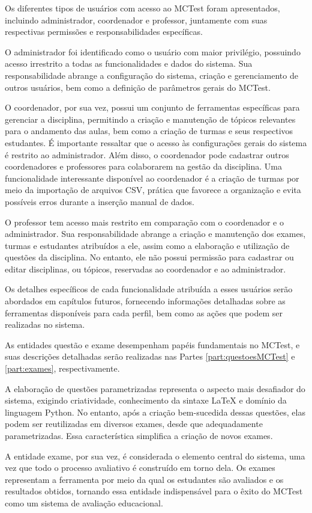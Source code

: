 Os diferentes tipos de usuários com acesso ao MCTest foram apresentados, incluindo administrador, coordenador e professor, juntamente com suas respectivas permissões e responsabilidades específicas.

O administrador foi identificado como o usuário com maior privilégio, possuindo acesso irrestrito a todas as funcionalidades e dados do sistema. Sua responsabilidade abrange a configuração do sistema, criação e gerenciamento de outros usuários, bem como a definição de parâmetros gerais do MCTest.

O coordenador, por sua vez, possui um conjunto de ferramentas específicas para gerenciar a disciplina, permitindo a criação e manutenção de tópicos relevantes para o andamento das aulas, bem como a criação de turmas e seus respectivos estudantes. É importante ressaltar que o acesso às configurações gerais do sistema é restrito ao administrador. Além disso, o coordenador pode cadastrar outros coordenadores e professores para colaborarem na gestão da disciplina. Uma funcionalidade interessante disponível ao coordenador é a criação de turmas por meio da importação de arquivos CSV, prática que favorece a organização e evita possíveis erros durante a inserção manual de dados.

O professor tem acesso mais restrito em comparação com o coordenador e o administrador. Sua responsabilidade abrange a criação e manutenção dos exames, turmas e estudantes atribuídos a ele, assim como a elaboração e utilização de questões da disciplina. No entanto, ele não possui permissão para cadastrar ou editar disciplinas, ou tópicos, reservadas ao coordenador e ao administrador. 

Os detalhes específicos de cada funcionalidade atribuída a esses usuários serão abordados em capítulos futuros, fornecendo informações detalhadas sobre as ferramentas disponíveis para cada perfil, bem como as ações que podem ser realizadas no sistema.

As entidades questão e exame desempenham papéis fundamentais no MCTest, e suas descrições detalhadas serão realizadas nas Partes \ref{part:questoesMCTest} e \ref{part:exames}, respectivamente. %

A elaboração de questões parametrizadas representa o aspecto mais desafiador do sistema, exigindo criatividade, conhecimento da sintaxe \LaTeX{} e domínio da linguagem Python. No entanto, após a criação bem-sucedida dessas questões, elas podem ser reutilizadas em diversos exames, desde que adequadamente parametrizadas. Essa característica simplifica a criação de novos exames.

A entidade exame, por sua vez, é considerada o elemento central do sistema, uma vez que todo o processo avaliativo é construído em torno dela. Os exames representam a ferramenta por meio da qual os estudantes são avaliados e os resultados obtidos, tornando essa entidade indispensável para o êxito do MCTest como um sistema de avaliação educacional.